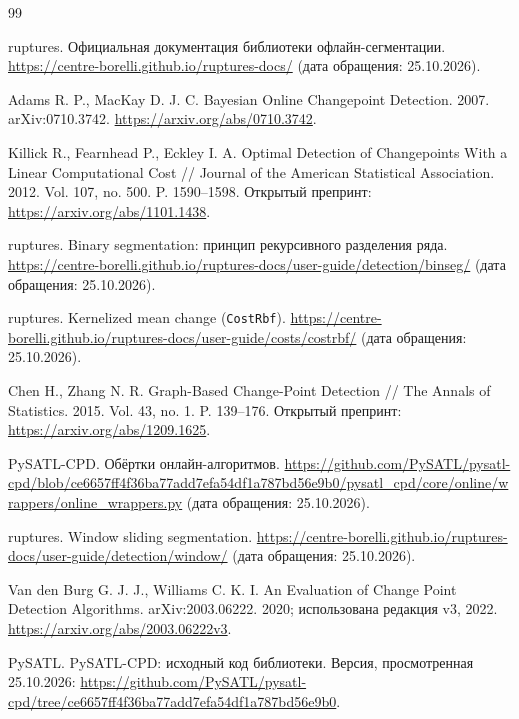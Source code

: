 \begin{thebibliography}{99}
\small
\setlength{\itemsep}{0.1em}

ruptures. Официальная документация библиотеки офлайн-сегментации.
\url{https://centre-borelli.github.io/ruptures-docs/}
(дата обращения: 25.10.2026).

Adams R. P., MacKay D. J. C.
Bayesian Online Changepoint Detection. 2007.
arXiv:0710.3742.
\url{https://arxiv.org/abs/0710.3742}.

Killick R., Fearnhead P., Eckley I. A.
Optimal Detection of Changepoints With a Linear Computational Cost //
Journal of the American Statistical Association.
2012. Vol. 107, no. 500. P. 1590--1598.
Открытый препринт: \url{https://arxiv.org/abs/1101.1438}.

ruptures. Binary segmentation: принцип рекурсивного разделения ряда.
\url{https://centre-borelli.github.io/ruptures-docs/user-guide/detection/binseg/}
(дата обращения: 25.10.2026).

ruptures. Kernelized mean change (\texttt{CostRbf}).
\url{https://centre-borelli.github.io/ruptures-docs/user-guide/costs/costrbf/}
(дата обращения: 25.10.2026).

Chen H., Zhang N. R.
Graph-Based Change-Point Detection // The Annals of Statistics.
2015. Vol. 43, no. 1. P. 139--176.
Открытый препринт: \url{https://arxiv.org/abs/1209.1625}.

PySATL-CPD. Обёртки онлайн-алгоритмов.
\url{https://github.com/PySATL/pysatl-cpd/blob/ce6657ff4f36ba77add7efa54df1a787bd56e9b0/pysatl_cpd/core/online/wrappers/online_wrappers.py}
(дата обращения: 25.10.2026).

ruptures. Window sliding segmentation.
\url{https://centre-borelli.github.io/ruptures-docs/user-guide/detection/window/}
(дата обращения: 25.10.2026).

Van den Burg G. J. J., Williams C. K. I.
An Evaluation of Change Point Detection Algorithms.
arXiv:2003.06222. 2020; использована редакция v3, 2022.
\url{https://arxiv.org/abs/2003.06222v3}.

PySATL. PySATL-CPD: исходный код библиотеки.
Версия, просмотренная 25.10.2026:
\url{https://github.com/PySATL/pysatl-cpd/tree/ce6657ff4f36ba77add7efa54df1a787bd56e9b0}.


\end{thebibliography}
